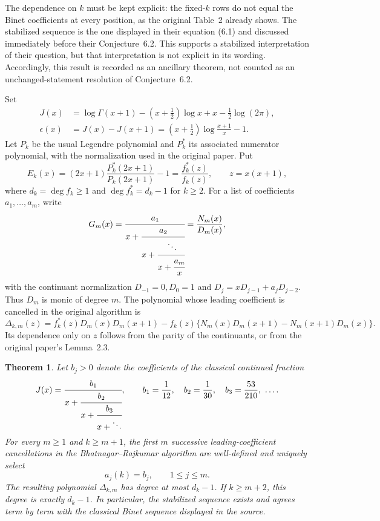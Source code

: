 \documentclass[11pt,a4paper]{article}
\newtheorem{theorem}{Theorem}[section]
\theoremstyle{definition}
\theoremstyle{remark}
\numberwithin{equation}{section}
\begin{document}
The dependence on $k$ must be kept explicit: the fixed-$k$ rows do
not equal the Binet coefficients at every position, as the original
Table~2 already shows. The stabilized sequence is the one displayed
in their equation (6.1) and discussed immediately before their
Conjecture~6.2. This supports a stabilized interpretation of their
question, but that interpretation is not explicit in its wording.
Accordingly, this result is recorded as an ancillary theorem, not
counted as an unchanged-statement resolution of Conjecture~6.2.

Set
\[
 \begin{aligned}
 J(x)&=\log\Gamma(x+1)-(x+\tfrac12)\log x+x-\tfrac12\log(2\pi),\\
 \epsilon(x)&=J(x)-J(x+1)
       =(x+\tfrac12)\log\frac{x+1}{x}-1.
 \end{aligned}
\]
Let $P_k$ be the usual Legendre polynomial and $P_k^*$ its associated
numerator polynomial, with the normalization used in the original
paper. Put
\[
 E_k(x)=(2x+1)\frac{P_k^*(2x+1)}{P_k(2x+1)}-1
        =\frac{f_k^*(z)}{f_k(z)},\qquad z=x(x+1),
\]
where $d_k=\deg f_k\ge1$ and $\deg f_k^*=d_k-1$ for $k\ge2$.
For a list of coefficients $a_1,\ldots,a_m$, write
\[
 G_m(x)=\cfrac{a_1}{x+\cfrac{a_2}{x+
                 \cfrac{\ddots}{x+\cfrac{a_m}{x}}}}
        =\frac{N_m(x)}{D_m(x)},
\]
with the continuant normalization
$D_{-1}=0,D_0=1$ and $D_j=xD_{j-1}+a_jD_{j-2}$.
Thus $D_m$ is monic of degree $m$.
The polynomial whose leading coefficient is cancelled in the
original algorithm is
\[
 \Delta_{k,m}(z)=f_k^*(z)D_m(x)D_m(x+1)
  -f_k(z)\{N_m(x)D_m(x+1)-N_m(x+1)D_m(x)\}.
\]
Its dependence only on $z$ follows from the parity of the continuants,
or from the original paper's Lemma~2.3.

\begin{theorem}\label{br:main}
Let $b_j>0$ denote the coefficients of the classical continued fraction
\[
 J(x)=\cfrac{b_1}{x+\cfrac{b_2}{x+\cfrac{b_3}{x+\ddots}}},
 \qquad b_1=\frac1{12},\quad b_2=\frac1{30},\quad
 b_3=\frac{53}{210},\ \ldots.
\]
For every $m\ge1$ and $k\ge m+1$, the first $m$ successive
leading-coefficient cancellations in the Bhatnagar--Rajkumar
algorithm are well-defined and uniquely select
\[
 a_j(k)=b_j,\qquad 1\le j\le m.
\]
The resulting polynomial $\Delta_{k,m}$ has degree at most $d_k-1$.
If $k\ge m+2$, this degree is exactly $d_k-1$.
In particular, the stabilized sequence exists and agrees term by
term with the classical Binet sequence displayed in the source.
\end{theorem}
\end{document}
